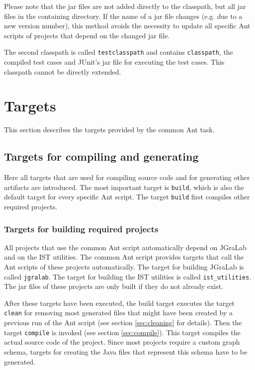 \documentclass[a4paper,twoside,11pt,bibtotoc]{article}
\begin{document}
Please note that the jar files are not added directly to the classpath, but all jar files in the containing directory.
If the name of a jar file changes (e.g. due to a new version number), this method avoids the necessity to update all specific Ant scripts of projects that depend on the changed jar file.

The second classpath is called \texttt{testclasspath} and contains \texttt{classpath}, the compiled test cases and JUnit's jar file for executing the test cases.
This classpath cannot be directly extended.

\section{Targets}
\label{sec:targets}
This section describes the targets provided by the common Ant task.

\subsection{Targets for compiling and generating}
\label{sec:creating}
Here all targets that are used for compiling source code and for generating other artifacts are introduced.
The most important target is \texttt{build}, which is also the default target for every specific Ant script.
The target \texttt{build} first compiles other required projects.

\subsubsection{Targets for building required projects}
\label{sec:required}
All projects that use the common Ant script automatically depend on JGraLab and on the IST utilities.
The common Ant script provides targets that call the Ant scripts of these projects automatically.
The target for building JGraLab is called \texttt{jgralab}.
The target for building the IST utilities is called \texttt{ist\_utilities}.
The jar files of these projects are only built if they do not already exist.

After these targets have been executed, the build target executes the target \texttt{clean} for removing most generated files that might have been created by a previous run of the Ant script (see section \ref{sec:cleaning} for details).
Then the target \texttt{compile} is invoked (see section \ref{sec:compile}).
This target compiles the actual source code of the project.
Since most projects require a custom graph schema, targets for creating the Java files that represent this schema have to be generated.
\end{document}
